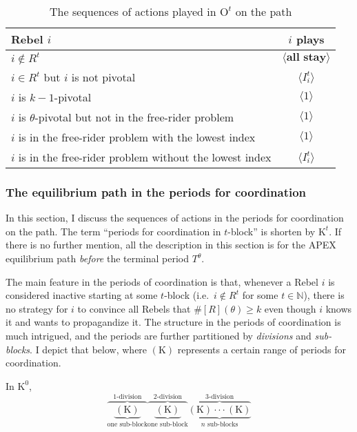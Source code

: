 \documentclass[12pt,letter]{article}
\newcommand{\Kappa}{\mathrm{K}}
\newcommand{\Omicron}{\mathrm{O}}
\theoremstyle{definition}
\theoremstyle{remark}
\theoremstyle{claim}
\begin{document}
\begin{table}[!htbp]
\caption{The sequences of actions played in $\Omicron^t$ on the path}
\label{Table_msg_RP_path}
\begin{center}
\begin{tabular}{l c}
Rebel $i$ & $i$ plays\\
\hline
\hline
$i\notin R^t$				& $\langle \textbf{all stay} \rangle$  \\
$i\in R^t$ but $i$ is not pivotal	 					 			& $\langle I^t_i \rangle$  \\
$i$ is $k-1$-pivotal	 					 			& $\langle 1 \rangle$  \\
$i$ is $\theta$-pivotal but not in the free-rider problem	 					 			& $\langle 1 \rangle$  \\
$i$ is in the free-rider problem with the lowest index	 					 			& $\langle 1 \rangle$  \\
$i$ is in the free-rider problem without the lowest index	 					 			& $\langle I^t_i \rangle$  \\
\hline
\end{tabular}
\end{center}
\end{table}


\subsubsection{The equilibrium path in the periods for coordination}
\label{sec:eq_cd}
In this section, I discuss the sequences of actions in the periods for coordination on the path. The term ``periods for coordination in $t$-block'' is shorten by $\Kappa^{t}$. If there is no further mention, all the description in this section is for the APEX equilibrium path \textit{before} the terminal period $T^{\theta}$. 

The main feature in the periods of coordination is that, whenever a Rebel $i$ is considered inactive starting at some $t$-block (i.e.~$i\notin R^t$ for some $t\in \mathbb{N}$), there is no strategy for $i$ to convince all Rebels that $\#[R](\theta)\geq k$ even though $i$ knows it and wants to propagandize it. The structure in the periods of coordination is much intrigued, and the periods are further partitioned by \textit{divisions} and \textit{sub-blocks}. I depict that below, where $(\Kappa)$ represents a certain range of periods for coordination. 



In $\Kappa^0$, 
\[\overbrace{\underbrace{( \Kappa) }_{\text{one sub-block}}}^{\text{$1$-division}} \overbrace{\underbrace{(\Kappa) }_{\text{one sub-block}}}^{\text{$2$-division}} \overbrace{\underbrace{(\Kappa) \cdot \cdot \cdot (\Kappa)}_{\text{$n$ sub-blocks}}}^{\text{$3$-division}}\] 
\end{document}
